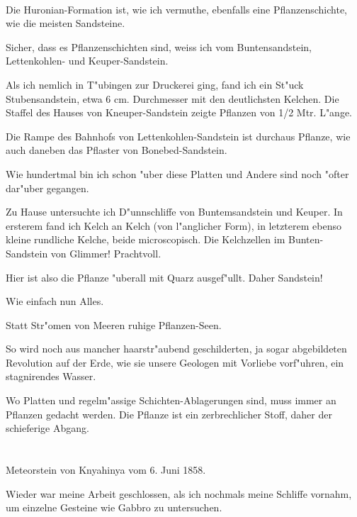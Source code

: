 \documentclass[a4paper, 11pt, oneside, german]{article}
\begin{document}
\paragraph{}
Die Huronian-Formation ist, wie ich vermuthe, ebenfalls eine Pflanzenschichte, wie die meisten Sandsteine.

Sicher, dass es Pflanzenschichten sind, weiss ich vom Buntensandstein, Lettenkohlen- und Keuper-Sandstein.

Als ich nemlich in T"ubingen zur Druckerei ging, fand ich ein St"uck Stubensandstein, etwa 6 cm. Durchmesser mit den deutlichsten Kelchen. Die Staffel des Hauses von Kneuper-Sandstein zeigte Pflanzen von 1/2 Mtr. L"ange.

Die Rampe des Bahnhofs von Lettenkohlen-Sandstein ist durchaus Pflanze, wie auch daneben das Pflaster von Bonebed-Sandstein.

Wie hundertmal bin ich schon "uber diese Platten und Andere sind noch "ofter dar"uber gegangen.

Zu Hause untersuchte ich D"unnschliffe von Buntemsandstein und Keuper. In ersterem fand ich Kelch an Kelch (von l"anglicher Form), in letzterem ebenso kleine rundliche Kelche, beide microscopisch. Die Kelchzellen im Bunten-Sandstein von Glimmer! Prachtvoll.

Hier ist also die Pflanze "uberall mit Quarz ausgef"ullt. Daher Sandstein!

Wie einfach nun Alles.

Statt Str"omen von Meeren ruhige Pflanzen-Seen.

So wird noch aus mancher haarstr"aubend geschilderten, ja sogar abgebildeten Revolution auf der Erde, wie sie unsere Geologen mit Vorliebe vorf"uhren, ein stagnirendes Wasser.

Wo Platten und regelm"assige Schichten-Ablagerungen sind, muss immer an Pflanzen gedacht werden. Die Pflanze ist ein zerbrechlicher Stoff, daher der schieferige Abgang.
\clearpage
\section{}
\paragraph{}
Meteorstein von Knyahinya vom 6. Juni 1858.

Wieder war meine Arbeit geschlossen, als ich nochmals meine Schliffe vornahm, um einzelne Gesteine wie Gabbro zu untersuchen.
\end{document}
